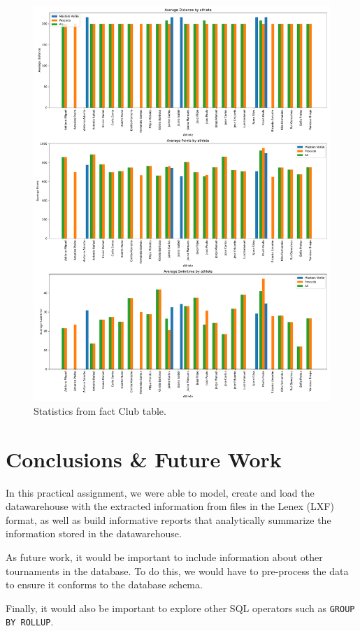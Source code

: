 \documentclass[a4paper, 11pt]{article}
\begin{document}
\begin{figure}[H]
    \centering
    \includegraphics[width=\textwidth]{img/athletefact.pdf}
    \caption{Statistics from fact Club table.}
    \label{fig:athlete_fact}
\end{figure}

\pagebreak

\section{Conclusions \& Future Work} \label{sec:conclusion}

In this practical assignment, we were able to model, create and load the
datawarehouse with the extracted information from files in the Lenex (LXF) format, as well as build informative reports that analytically summarize the information stored in the datawarehouse.

As future work, it would be important to include information about other tournaments in the database.
To do this, we would have to pre-process the data to ensure it conforms to the database schema.

Finally, it would also be important to explore other SQL operators such as \texttt{GROUP BY ROLLUP}.
\end{document}
